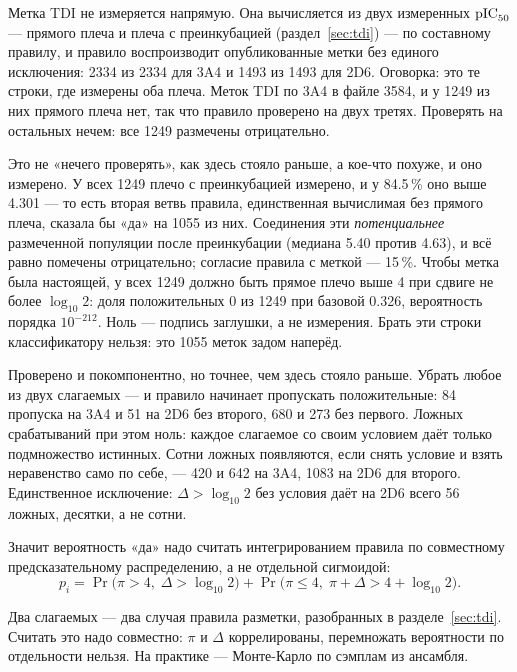 Метка TDI не измеряется напрямую. Она вычисляется из двух измеренных $\mathrm{pIC}_{50}$ --- прямого плеча
и плеча с преинкубацией (раздел~\ref{sec:tdi}) --- по составному правилу, и правило воспроизводит
опубликованные метки без единого исключения: 2334 из 2334 для 3A4 и 1493 из 1493 для 2D6. Оговорка:
это те строки, где измерены оба плеча. Меток TDI по 3A4 в файле 3584, и у 1249 из них прямого плеча нет,
так что правило проверено на двух третях. Проверять на остальных нечем: все 1249 размечены отрицательно.

Это не «нечего проверять», как здесь стояло раньше, а кое-что похуже, и оно измерено. У всех 1249
плечо с преинкубацией измерено, и у 84.5\,\% оно выше 4.301 --- то есть вторая ветвь правила,
единственная вычислимая без прямого плеча, сказала бы «да» на 1055 из них. Соединения эти
\emph{потенциальнее} размеченной популяции после преинкубации (медиана 5.40 против 4.63), и всё
равно помечены отрицательно; согласие правила с меткой --- 15\,\%. Чтобы метка была настоящей,
у всех 1249 должно быть прямое плечо выше 4 при сдвиге не более $\log_{10}2$: доля положительных
0 из 1249 при базовой 0.326, вероятность порядка $10^{-212}$. Ноль --- подпись заглушки, а не
измерения. Брать эти строки классификатору нельзя: это 1055 меток задом наперёд.

Проверено и покомпонентно, но точнее, чем здесь стояло раньше. Убрать любое из двух слагаемых ---
и правило начинает пропускать положительные: 84 пропуска на 3A4 и 51 на 2D6 без второго, 680 и 273
без первого. Ложных срабатываний при этом ноль: каждое слагаемое со своим условием даёт только
подмножество истинных. Сотни ложных появляются, если снять условие и взять неравенство само по себе, ---
420 и 642 на 3A4, 1083 на 2D6 для второго. Единственное исключение: $\Delta > \log_{10}2$ без условия
даёт на 2D6 всего 56 ложных, десятки, а не сотни.

Значит вероятность «да» надо считать интегрированием правила по совместному предсказательному
распределению, а не отдельной сигмоидой:
\begin{equation}
p_i = \Pr\bigl(\pi > 4,\; \Delta > \log_{10} 2\bigr)
    + \Pr\bigl(\pi \le 4,\; \pi + \Delta > 4 + \log_{10} 2\bigr) .
\label{eq:tdirule}
\end{equation}

Два слагаемых --- два случая правила разметки, разобранных в разделе~\ref{sec:tdi}. Считать это надо
совместно: $\pi$ и $\Delta$ коррелированы, перемножать вероятности по отдельности нельзя. На практике ---
Монте-Карло по сэмплам из ансамбля.

